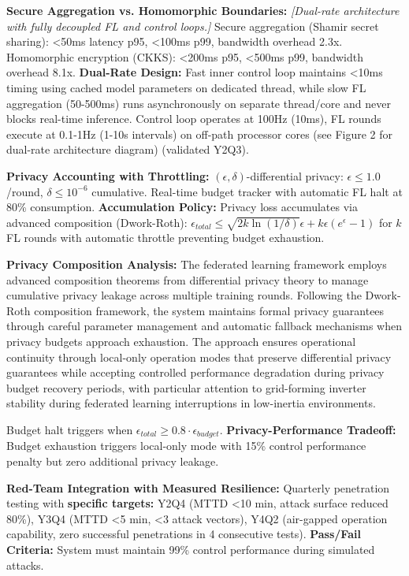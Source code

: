 \documentclass[12pt]{article}
\begin{document}
\textbf{Secure Aggregation vs. Homomorphic Boundaries:} \textit{[Dual-rate architecture with fully decoupled FL and control loops.]} Secure aggregation (Shamir secret sharing): <50ms latency p95, <100ms p99, bandwidth overhead 2.3x. Homomorphic encryption (CKKS): <200ms p95, <500ms p99, bandwidth overhead 8.1x. \textbf{Dual-Rate Design:} Fast inner control loop maintains <10ms timing using cached model parameters on dedicated thread, while slow FL aggregation (50-500ms) runs asynchronously on separate thread/core and never blocks real-time inference. Control loop operates at 100Hz (10ms), FL rounds execute at 0.1-1Hz (1-10s intervals) on off-path processor cores (see Figure 2 for dual-rate architecture diagram) (validated Y2Q3).

\textbf{Privacy Accounting with Throttling:} $(\epsilon, \delta)$-differential privacy: $\epsilon \leq 1.0$/round, $\delta \leq 10^{-6}$ cumulative. Real-time budget tracker with automatic FL halt at 80\% consumption. \textbf{Accumulation Policy:} Privacy loss accumulates via advanced composition (Dwork-Roth): $\epsilon_{total} \leq \sqrt{2k\ln(1/\delta)}\epsilon + k\epsilon(e^\epsilon - 1)$ for $k$ FL rounds with automatic throttle preventing budget exhaustion.

\textbf{Privacy Composition Analysis:} The federated learning framework employs advanced composition theorems from differential privacy theory to manage cumulative privacy leakage across multiple training rounds. Following the Dwork-Roth composition framework, the system maintains formal privacy guarantees through careful parameter management and automatic fallback mechanisms when privacy budgets approach exhaustion. The approach ensures operational continuity through local-only operation modes that preserve differential privacy guarantees while accepting controlled performance degradation during privacy budget recovery periods, with particular attention to grid-forming inverter stability during federated learning interruptions in low-inertia environments.

Budget halt triggers when $\epsilon_{total} \geq 0.8 \cdot \epsilon_{budget}$. \textbf{Privacy-Performance Tradeoff:} Budget exhaustion triggers local-only mode with 15\% control performance penalty but zero additional privacy leakage.

\textbf{Red-Team Integration with Measured Resilience:} Quarterly penetration testing with \textbf{specific targets:} Y2Q4 (MTTD <10 min, attack surface reduced 80\%), Y3Q4 (MTTD <5 min, <3 attack vectors), Y4Q2 (air-gapped operation capability, zero successful penetrations in 4 consecutive tests). \textbf{Pass/Fail Criteria:} System must maintain 99\% control performance during simulated attacks.
\end{document}
